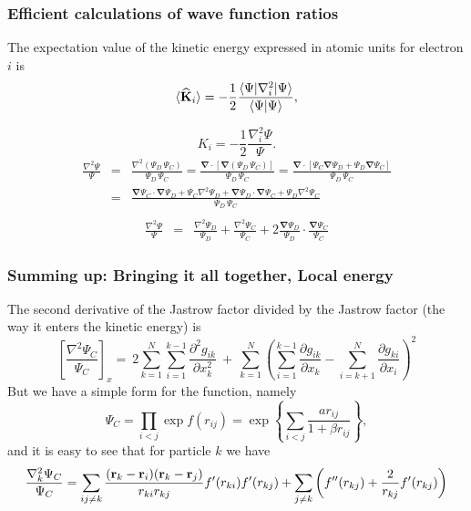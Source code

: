 \documentclass[compress]{beamer}
\newcommand{\Grad}[1]{\boldsymbol{\nabla}{#1}}
\newcommand{\Op}[1]{{\bf\widehat{#1}}}                    %
\begin{document}
\frame
 {
   \frametitle{Efficient calculations of wave function ratios}
 \begin{small}
 {\scriptsize

The expectation value of the kinetic energy expressed in atomic units for electron $i$ is 
\begin{equation}
 \langle \Op{K}_i \rangle = -\frac{1}{2}\frac{\langle\Psi|\nabla_{i}^2|\Psi \rangle}{\langle\Psi|\Psi \rangle},
\end{equation}

\begin{equation}\label{kineticE}
K_i = -\frac{1}{2}\frac{\nabla_{i}^{2} \Psi}{\Psi}.
\end{equation}
\begin{eqnarray}
\frac{\nabla^2 \Psi}{\Psi} & = & \frac{\nabla^2 ({\Psi_{D} \,  \Psi_C})}{\Psi_{D} \,  \Psi_C} = \frac{\Grad \cdot [\Grad {(\Psi_{D} \,  \Psi_C)}]}{\Psi_{D} \,  \Psi_C} = \frac{\Grad \cdot [ \Psi_C \Grad \Psi_{D} + \Psi_{D} \Grad  \Psi_C]}{\Psi_{D} \,  \Psi_C}\nonumber\\
&  = & \frac{\Grad  \Psi_C \cdot \Grad \Psi_{D} +  \Psi_C \nabla^2 \Psi_{D} + \Grad \Psi_{D} \cdot \Grad  \Psi_C + \Psi_{D} \nabla^2  \Psi_C}{\Psi_{D} \,  \Psi_C}\nonumber\\
\end{eqnarray}
\begin{eqnarray}
\frac{\nabla^2 \Psi}{\Psi}
& = & \frac{\nabla^2 \Psi_{D}}{\Psi_{D}} + \frac{\nabla^2  \Psi_C}{ \Psi_C} + 2 \frac{\Grad \Psi_{D}}{\Psi_{D}}\cdot\frac{\Grad  \Psi_C}{ \Psi_C}
\end{eqnarray}
 }
 \end{small}
 }


\frame
{
  \frametitle{Summing up: Bringing it all together, Local energy}
\begin{small}
{\scriptsize

The second derivative of the Jastrow factor divided by the Jastrow factor (the way it enters the kinetic energy) is
\[
\left[\frac{\nabla^2 \Psi_C}{\Psi_C}\right]_x =\  
2\sum_{k=1}^{N}
\sum_{i=1}^{k-1}\frac{\partial^2 g_{ik}}{\partial x_k^2}\ +\ 
\sum_{k=1}^N
\left(
\sum_{i=1}^{k-1}\frac{\partial g_{ik}}{\partial x_k} -
\sum_{i=k+1}^{N}\frac{\partial g_{ki}}{\partial x_i}
\right)^2
\]
But we have a simple form for the function, namely
\[
\Psi_{C}=\prod_{i< j}\exp{f(r_{ij})}= \exp{\left\{\sum_{i<j}\frac{ar_{ij}}{1+\beta r_{ij}}\right\}},
\]
and it is easy to see that for particle  $k$
we have
\[
  \frac{\nabla^2_k \Psi_C}{\Psi_C }=
\sum_{ij\ne k}\frac{({\bf r}_k-{\bf r}_i)({\bf r}_k-{\bf r}_j)}{r_{ki}r_{kj}}f'(r_{ki})f'(r_{kj})+
\sum_{j\ne k}\left( f''(r_{kj})+\frac{2}{r_{kj}}f'(r_{kj})\right)
\]
}
\end{small}
}
\end{document}
